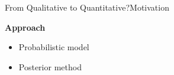 \begin{frame}{From Qualitative to Quantitative?}{Motivation}
\begin{block}{\bf Approach}
\begin{center}
\begin{minipage}[t]{.8\textwidth}
\begin{block}{}
\begin{itemize}
\item Probabilistic model
\end{itemize}
\end{block}
\end{minipage}
\end{center}

\begin{center}
\begin{minipage}[t]{.8\textwidth}
\centering
\begin{block}{}
\begin{itemize}
\item Posterior method
\end{itemize}
\end{block}
\end{minipage}
\end{center}

\end{block}

\end{frame}


